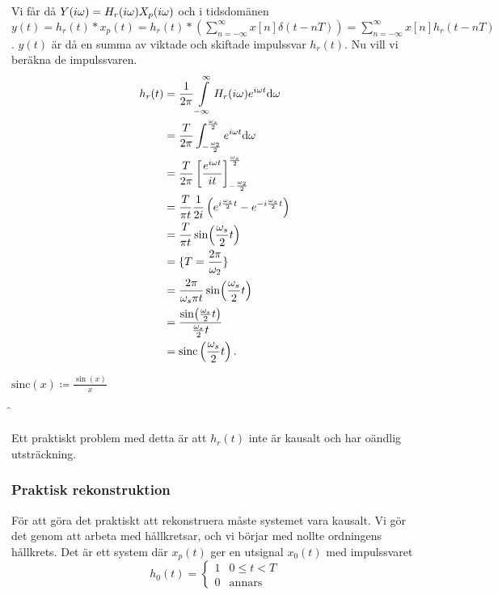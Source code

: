 \documentclass[a4paper]{article}
\begin{document}
Vi får då \(
    Y(i\omega) = H_r(i\omega)X_p(i\omega)
\) och i tidsdomänen \(
    y(t) = h_r(t) * x_p(t) 
         = h_r(t) * (\sum_{n=-\infty}^\infty x[n] \delta(t-nT))
         = \sum_{n=-\infty}^\infty x[n] h_r(t-nT)
\). \(
    y(t)
\) är då en summa av viktade och skiftade impulssvar \(
    h_r(t)
\). Nu vill vi beräkna de impulssvaren. 
\begin{align*}
    h_r(t) &= \frac{1}{2\pi} \displaystyle\int\limits_{-\infty}^{\infty} H_r(i\omega) e^{i\omega t} \dd \omega \\
           &= \frac{T}{2\pi} \int_{-\frac{\omega_2}{2}}^{\frac{\omega_s}{2}} 
                e^{i\omega t} \dd \omega \\
           &= \frac{T}{2\pi} \left[ \frac{e^{i\omega t}}{it} \right]_{-\frac{\omega_2}{2}}^{\frac{\omega_s}{2}} \\
           &= \frac{T}{\pi t} \frac{1}{2i} \left(e^{i \frac{\omega_s}{2}t} - e^{-i \frac{\omega_s}{2}t}\right) \\
           &= \frac{T}{\pi t} \sin(\frac{\omega_s}{2} t)  \\
           &= \{T = \frac{2\pi}{\omega_2} \} \\
           &= \frac{2\pi}{\omega_s \pi t} \sin(\frac{\omega_s}{2} t)  \\
           &= \frac{\sin(\frac{\omega_s}{2} t)}{\frac{\omega_s}{2} t} \\
           &= \text{sinc}\left(\frac{\omega_s}{2} t\right). \\
\end{align*}

\begin{defn}[sinc]
    \(
        \text{sinc}(x) \coloneqq \frac{\sin(x)}{x} 
    \) 

    \f
\end{defn}

Ett praktiskt problem med detta är att \(
    h_r(t)
\) inte är kausalt och har oändlig utsträckning.

\subsubsection{Praktisk rekonstruktion}
För att göra det praktiskt att rekonstruera måste systemet vara kausalt.
Vi gör det genom att arbeta med hållkretsar, och vi börjar med nollte 
ordningens hållkrets. Det är ett system där \(
    x_p(t)
\) ger en utsignal \(
    x_0(t)
\) med impulssvaret
\[
    h_0(t) = \left\{\begin{matrix}
                 1 & 0 \leq t < T\\ 
                 0 & \text{annars} 
             \end{matrix}\right.
\] 
\end{document}
